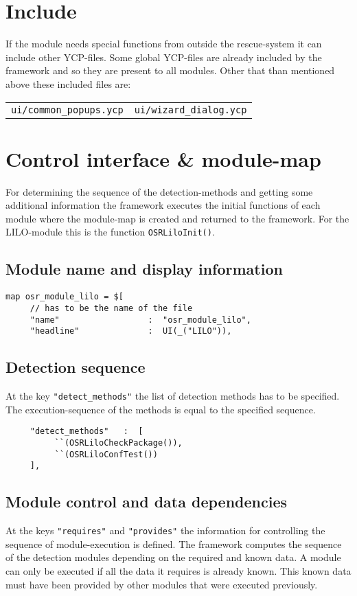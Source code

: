 \section{Include}
If the module needs special functions from outside the rescue-system it
can include other YCP-files. Some global YCP-files are already included
by the framework and so they are present to all modules. Other that than
mentioned above these included files are:\\

\begin{tabular}{ll}
\verb+ui/common_popups.ycp+ & \verb+ui/wizard_dialog.ycp+\\
\end{tabular}

\section{Control interface \& module-map}
For determining the sequence of the detection-methods and getting some
additional information the framework executes the initial functions of
each module where the module-map is created and returned to the framework.
For the LILO-module this is the function \verb+OSRLiloInit()+.\\

\subsection{Module name and display information}

{\footnotesize \begin{verbatim}
map osr_module_lilo = $[
     // has to be the name of the file
     "name"                  :  "osr_module_lilo",
     "headline"              :  UI(_("LILO")),
\end{verbatim}}%

\subsection{Detection sequence}
At the key \verb+"detect_methods"+ the list of detection methods has to
be specified. The execution-sequence of the methods is equal to the 
specified sequence.

{\footnotesize \begin{verbatim}
     "detect_methods"   :  [
          ``(OSRLiloCheckPackage()),
          ``(OSRLiloConfTest())
     ],
\end{verbatim}}

\subsection{Module control and data dependencies}
At the keys \verb+"requires"+ and \verb+"provides"+ the information for
controlling the sequence of module-execution is defined. The framework
computes the sequence of the detection modules depending on the required
and known data. A module can only be executed if all the data it requires
is already known. This known data must have been provided by other modules
that were executed previously.\\

